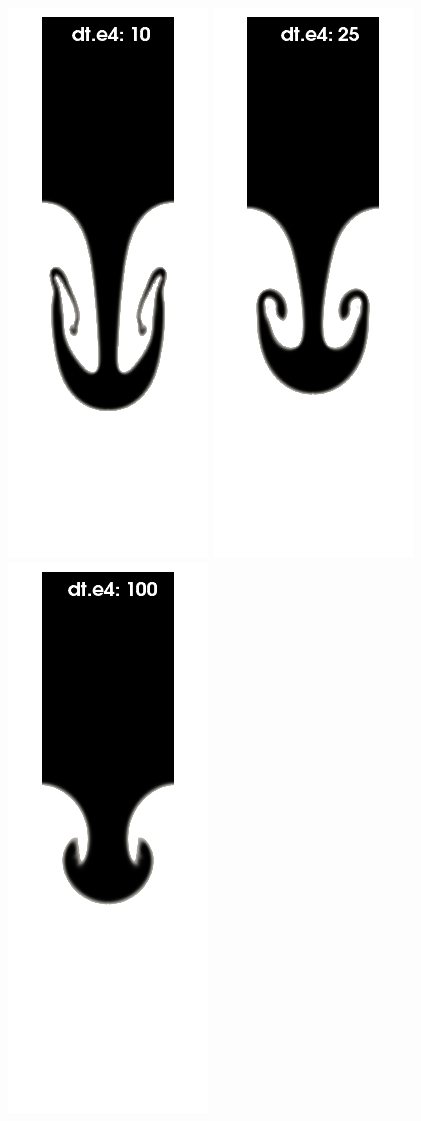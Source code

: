 \begin{figure}[htbp]
  \begin{center}

      \includegraphics[width=.24\columnwidth]{images/rayleigh_foam_dts_A.jpg}
      \includegraphics[width=.24\columnwidth]{images/rayleigh_foam_dts_B.jpg}
      \includegraphics[width=.24\columnwidth]{images/rayleigh_foam_dts_C.jpg}

\end{center}
\end{figure}
